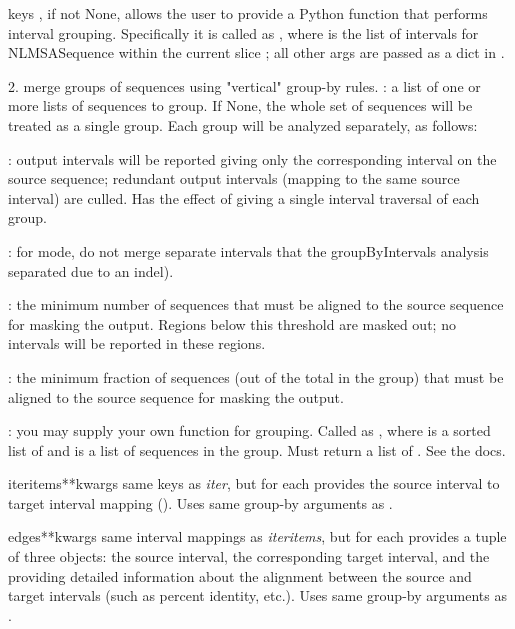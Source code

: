 \documentclass{howto}
\begin{document}
\begin{funcdesc}{keys}
  ,
  if not None, allows the user to provide a Python function that performs
  interval grouping.  Specifically it is called as
  , where  is the
  list of intervals for NLMSASequence  within the current slice 
  ; all other args are passed as a dict in .

  2. merge groups of sequences using "vertical" group-by rules.
  : a list of one or more lists of sequences to group.
  If None, the whole set of sequences will be treated as a single group.
  Each group will be analyzed separately, as follows:

  : output intervals will be reported giving only
  the corresponding interval on the source sequence; redundant
  output intervals (mapping to the same source interval) are
  culled.  Has the effect of giving a single interval traversal
  of each group.

  : for  mode, do not merge separate 
  intervals that the groupByIntervals analysis separated due to an indel).

  : the minimum number of sequences that must be aligned to
  the source sequence for masking the output.  Regions below
  this threshold are masked out; no intervals will be reported
  in these regions.

  : the minimum fraction of sequences (out of the
  total in the group) that must be aligned to the source
  sequence for masking the output.

  : you may supply your own function for grouping.
  Called as , where
   is a sorted list of
  and  is a list of sequences in the group.
  Must return a list of .  See the docs.

\end{funcdesc}


\begin{funcdesc}{iteritems}{**kwargs}
  same keys as {\em iter}, but for each provides the source interval
  to target interval mapping ().
  Uses same group-by arguments as .
\end{funcdesc}


\begin{funcdesc}{edges}{**kwargs}
  same interval mappings as {\em iteritems}, but for
  each provides a tuple of three objects:
  the source interval, the corresponding target interval,
  and the  providing detailed
  information about the alignment between the source and target intervals
  (such as percent identity, etc.).
  Uses same group-by arguments as .
\end{funcdesc}
\end{document}
